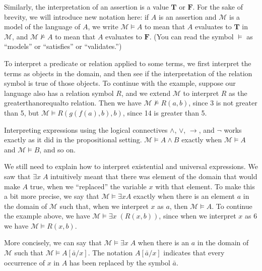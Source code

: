 \documentclass[letterpaper,10pt,english]{sphinxmanual}
\begin{document}
\sphinxAtStartPar
Similarly, the interpretation of an assertion is a value \(\mathbf{T}\) or \(\mathbf{F}\). For the sake of brevity, we will introduce new notation here: if \(A\) is an assertion and \({\mathcal M}\) is a model of the language of \(A\), we write \({\mathcal M} \models A\) to mean that \(A\) evaluates to \(\mathbf{T}\) in \({\mathcal M}\), and \({\mathcal M} \not\models A\) to mean that \(A\) evaluates to \(\mathbf{F}\). (You can read the symbol \(\models\) as “models” or “satisfies” or “validates.”)

\sphinxAtStartPar
To interpret a predicate or relation applied to some terms, we first interpret the terms as objects in the domain, and then see if the interpretation of the relation symbol is true of those objects. To continue with the example, suppose our language also has a relation symbol \(\mathit{R}\), and we extend \({\mathcal M}\) to interpret \(R\) as the greater\sphinxhyphen{}than\sphinxhyphen{}or\sphinxhyphen{}equal\sphinxhyphen{}to relation. Then we have \({\mathcal M} \not \models R(a, b)\), since 3 is not greater than 5, but \({\mathcal M} \models R(g(f(a),b),b)\), since 14 is greater than 5.

\sphinxAtStartPar
Interpreting expressions using the logical connectives \(\wedge\), \(\vee\), \(\to\), and \(\neg\) works exactly as it did in the propositional setting. \({\mathcal M} \models A \wedge B\) exactly when \({\mathcal M} \models A\) and \({\mathcal M} \models B\), and so on.

\sphinxAtStartPar
We still need to explain how to interpret existential and universal expressions. We saw that \(\exists x \; A\) intuitively meant that there was  element of the domain that would make \(A\) true, when we “replaced” the variable \(x\) with that element. To make this a bit more precise, we say that \({\mathcal M} \models \exists x A\) exactly when there is an element \(a\) in the domain of \({\mathcal M}\) such that, when we interpret \(x\) as \(a\), then \({\mathcal M} \models A\). To continue the example above, we have \({\mathcal M} \models \exists x \; (R(x, b))\), since when we interpret \(x\) as 6 we have \({\mathcal M} \models R(x, b)\).

\sphinxAtStartPar
More concisely, we can say that \({\mathcal M} \models \exists x \; A\) when there is an \(a\) in the domain of \({\mathcal M}\) such that \({\mathcal M} \models A[\bar a / x]\). The notation \(A[\bar a / x]\) indicates that every occurrence of \(x\) in \(A\) has been replaced by the symbol \(\bar a\).
\end{document}
